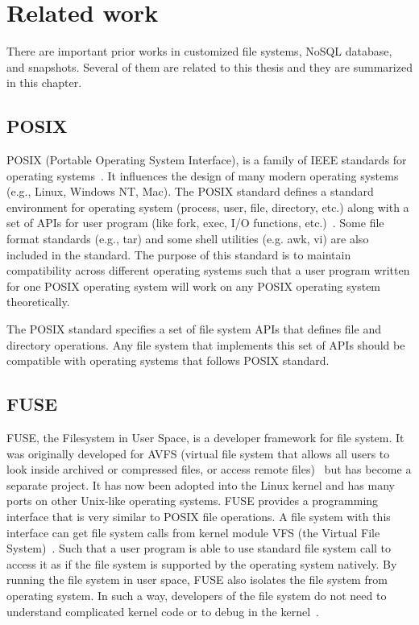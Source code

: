 \chapter{Related work}
\label{chap:related_work}

    There are important prior works in customized file systems, NoSQL database, and snapshots. Several of them are related to this thesis and they are summarized in this chapter.

\section{POSIX}

    POSIX (Portable Operating System Interface), is a family of IEEE standards for operating systems~\cite{posix_wiki}. It influences the design of many modern operating systems (e.g., Linux, Windows NT, Mac). The POSIX standard defines a standard environment for operating system (process, user, file, directory, etc.) along with a set of APIs for user program (like fork, exec, I/O functions, etc.)~\cite{posix}. Some file format standards (e.g., tar) and some shell utilities (e.g. awk, vi) are also included in the standard. The purpose of this standard is to maintain compatibility across different operating systems such that a user program written for one POSIX operating system will work on any POSIX operating system theoretically. 

    The POSIX standard specifies a set of file system APIs that defines file and directory operations. Any file system that implements this set of APIs should be compatible with operating systems that follows POSIX standard.

\section{FUSE}

    FUSE, the Filesystem in User Space, is a developer framework for file system. It was originally developed for AVFS (virtual file system that allows all users
to look inside archived or compressed files, or access remote files)~\cite{avfs} but has become a separate project. It has now been adopted into the Linux kernel and has many ports on other Unix-like operating systems. FUSE provides a programming interface that is very similar to POSIX file operations. A file system with this interface can get file system calls from kernel module VFS (the Virtual File System)~\cite{vfs}. Such that a user program is able to use standard file system call to access it as if the file system is supported by the operating system natively. By running the file system in user space, FUSE also isolates the file system from operating system. In such a way, developers of the file system do not need to understand complicated kernel code or to debug in the kernel~\cite{fuse}.

